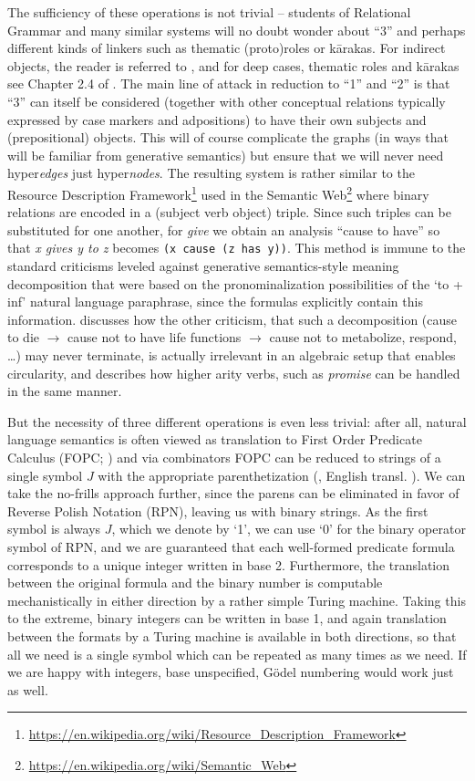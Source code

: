 \documentclass[output=paper]{langscibook}
\begin{document}
The sufficiency of these operations is not trivial -- students of Relational
Grammar and many similar systems will no doubt wonder about ``3'' and perhaps
different kinds of linkers such as thematic (proto)roles or k\={a}rakas. For
indirect objects, the reader is referred to \citet{Kornai:2012}, and for deep
cases, thematic roles and k\={a}rakas see Chapter 2.4 of \citet{Kornai:2022}.
The main line of attack in reduction to ``1'' and ``2'' is that ``3'' can itself be
considered (together with other conceptual relations typically expressed by
case markers and adpositions) to have their own subjects and (prepositional)
objects. This will of course complicate the graphs (in ways that will be
familiar from generative semantics) but ensure that we will never need
hyper\textit{edges} just hyper\textit{nodes}. The resulting system is rather similar
to the
Resource Description Framework\footnote{\url{https://en.wikipedia.org/wiki/Resource_Description_Framework}} used in the
Semantic Web\footnote{\url{https://en.wikipedia.org/wiki/Semantic_Web}} where binary
relations are encoded in a (subject verb object) triple. Since such
triples can be substituted for one another, for \textit{give} we obtain an analysis
``cause to have'' so that \textit{x gives y to z} becomes \texttt{(x cause (z has
  y))}. This method is immune to the standard criticisms \citep{Fodor:1970}
leveled against generative semantics-style meaning decomposition that were
based on the pronominalization possibilities of the `to + inf' natural
language paraphrase, since the formulas explicitly contain this information.
\citet{Kornai:2010} discusses how the other criticism, that such a
decomposition (cause to die $\rightarrow$ cause not to have life functions
$\rightarrow$ cause not to metabolize, respond, \ldots) may never terminate,
is actually irrelevant in an algebraic setup that enables circularity, and
\citet{Kornai:2012} describes how higher arity verbs, such as \textit{promise} can
be handled in the same manner. 

But the necessity of three different operations is even less trivial: after all,
natural language semantics is often viewed as translation to First Order
Predicate Calculus (FOPC; \cite{Blackburn:2015}) and via combinators
\citep{Curry:1958} FOPC can be reduced to strings of a single symbol $J$ with
the appropriate parenthetization (\cite{Schoenfinkel:1924}, English
transl. \cite{Heijenoort:1967}). We can take the no-frills approach further,
since the parens can be eliminated in favor of Reverse Polish Notation (RPN),
leaving us with binary strings. As the first symbol is always $J$, which we
denote by `1', we can use `0' for the binary operator symbol of RPN, and we
are guaranteed that each well-formed predicate formula corresponds to a unique
integer written in base 2. Furthermore, the translation between the original
formula and the binary number is computable mechanistically in either
direction by a rather simple Turing machine. Taking this to the extreme,
binary integers can be written in base 1, and again translation between the
formats by a Turing machine is available in both directions, so that all we need
is a single symbol which can be repeated as many times as we need. If we are
happy with integers, base unspecified, Gödel numbering would work just as
well.
\end{document}
